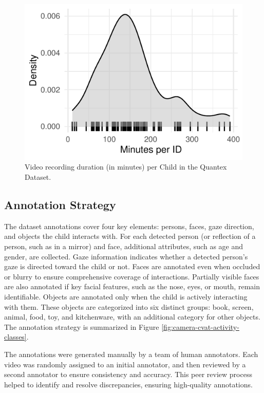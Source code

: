 \documentclass[
  man,floatsintext]{apa6}
\begin{document}
\begin{figure}

{\centering \includegraphics{Quantex_interaction_paper_files/figure-latex/quantex-minutes-per-child-1} 

}

\caption{Video recording duration (in minutes) per Child in the Quantex Dataset.}\label{fig:quantex-minutes-per-child}
\end{figure}

\subsection{Annotation Strategy}\label{annotation-strategy}

The dataset annotations cover four key elements: persons, faces, gaze direction, and objects the child interacts with. For each detected person (or reflection of a person, such as in a mirror) and face, additional attributes, such as age and gender, are collected. Gaze information indicates whether a detected person's gaze is directed toward the child or not. Faces are annotated even when occluded or blurry to ensure comprehensive coverage of interactions. Partially visible faces are also annotated if key facial features, such as the nose, eyes, or mouth, remain identifiable. Objects are annotated only when the child is actively interacting with them. These objects are categorized into six distinct groups: book, screen, animal, food, toy, and kitchenware, with an additional category for other objects. The annotation strategy is summarized in Figure \ref{fig:camera-cvat-activity-classes}.

The annotations were generated manually by a team of human annotators. Each video was randomly assigned to an initial annotator, and then reviewed by a second annotator to ensure consistency and accuracy. This peer review process helped to identify and resolve discrepancies, ensuring high-quality annotations.
\end{document}
